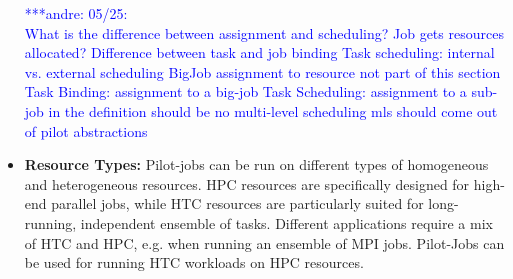 \documentclass[conference,final]{IEEEtran}
\newcommand{\alnote}[1]{ {\textcolor{blue} { ***andre: #1 }}}
\newcommand{\alnote}[1]{}
\begin{document}
\begin{itemize}
	\alnote{05/25:\\
	What is the difference between assignment and scheduling? Job gets
	resources allocated? 
	Difference between task and job binding
	Task scheduling: internal vs. external scheduling
	BigJob assignment to resource not part of this section
	Task Binding: assignment to a big-job
	Task Scheduling: assignment to a sub-job	
	in the definition should be no multi-level scheduling
    mls should come out of pilot abstractions
}
	

\item \textbf{Resource Types:} Pilot-jobs can be run on different 
types of homogeneous and heterogeneous resources. HPC resources are specifically 
designed for high-end parallel jobs, while HTC resources are particularly suited 
for long-running, independent 
ensemble of tasks. Different applications require a mix of HTC and HPC, e.g. 
when running an ensemble of MPI jobs. Pilot-Jobs can be used for running HTC 
workloads on HPC resources. 


\end{itemize}
\end{document}
